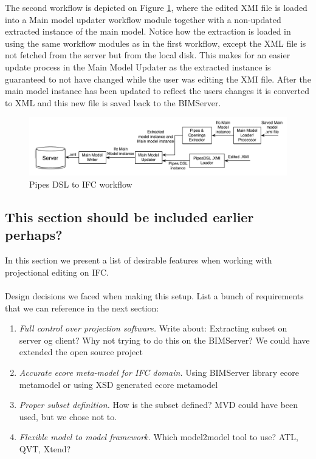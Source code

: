 The second workflow is depicted on Figure \ref{fig:Pipes2IFCWorkflow}, where the edited XMI file is loaded into a Main model updater workflow module together with a non-updated extracted instance of the main model. Notice how the extraction is loaded in using the same workflow modules as in the first workflow, except the XML file is not fetched from the server but from the local disk. This makes for an easier update process in the Main Model Updater as the extracted instance is guaranteed to not have changed while the user was editing the XMI file. After the main model instance has been updated to reflect the users changes it is converted to XML and this new file is saved back to the BIMServer.

\begin{figure}[htbp]
    \centering
        \includegraphics[width=120mm]{images/Pipes2IFC.pdf}
    \caption{Pipes DSL to IFC workflow}
    \label{fig:Pipes2IFCWorkflow}
\end{figure}

\subsection{This section should be included earlier perhaps?}
In this section we present a list of desirable features when working with projectional editing on IFC.
\paragraph{}
Design decisions we faced when making this setup. List a bunch of requirements that we can reference in the next section: 
\begin{enumerate}[itemsep=0pt,parsep=2pt,topsep=10pt]
	\item {\it Full control over projection software.} Write about: Extracting subset on server og client? Why not trying to do this on the BIMServer? We could have extended the open source project
	\item {\it Accurate ecore meta-model for IFC domain.} Using BIMServer library ecore metamodel or using XSD generated ecore metamodel
	\item {\it Proper subset definition.} How is the subset defined? MVD could have been used, but we chose not to.
	\item {\it Flexible model to model framework.} Which model2model tool to use? ATL, QVT, Xtend?
\end{enumerate}





